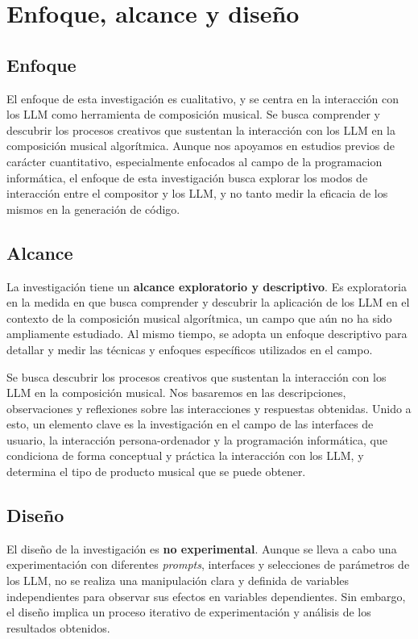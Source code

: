 \section{Enfoque, alcance y diseño}

\subsection{Enfoque}

El enfoque de esta investigación es cualitativo, y se centra en la interacción con los LLM como herramienta de composición musical. Se busca comprender y descubrir los procesos creativos que sustentan la interacción con los LLM en la composición musical algorítmica. Aunque nos apoyamos en estudios previos de carácter cuantitativo, especialmente enfocados al campo de la programacion informática, el enfoque de esta investigación busca explorar los modos de interacción entre el compositor y los LLM, y no tanto medir la eficacia de los mismos en la generación de código. 

\subsection{Alcance}
La investigación tiene un \textbf{alcance exploratorio y descriptivo}. Es exploratoria en la medida en que busca comprender y descubrir la aplicación de los LLM en el contexto de la composición musical algorítmica, un campo que aún no ha sido ampliamente estudiado. Al mismo tiempo, se adopta un enfoque descriptivo para detallar y medir las técnicas y enfoques específicos utilizados en el campo.

Se busca descubrir los procesos creativos que sustentan la interacción con los LLM en la composición musical. Nos basaremos en las descripciones, observaciones y reflexiones sobre las interacciones y respuestas obtenidas. Unido a esto, un elemento clave es la investigación en el campo de las interfaces de usuario, la interacción persona-ordenador y la programación informática, que condiciona de forma conceptual y práctica la interacción con los LLM, y determina el tipo de producto musical que se puede obtener.

\subsection{Diseño}
El diseño de la investigación es \textbf{no experimental}. Aunque se lleva a cabo una experimentación con diferentes \textit{prompts}, interfaces y selecciones de parámetros de los LLM, no se realiza una manipulación clara y definida de variables independientes para observar sus efectos en variables dependientes. Sin embargo, el diseño implica un proceso iterativo de experimentación y análisis de los resultados obtenidos.

